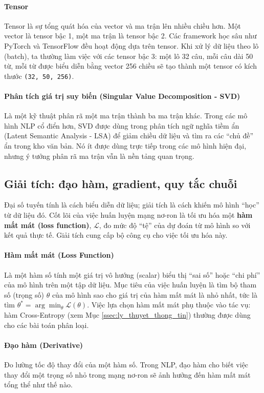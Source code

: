 \paragraph{Tensor}
Tensor là sự tổng quát hóa của vector và ma trận lên nhiều chiều hơn. Một vector là tensor bậc 1, một ma trận là tensor bậc 2. Các framework học sâu như PyTorch và TensorFlow đều hoạt động dựa trên tensor. Khi xử lý dữ liệu theo lô (batch), ta thường làm việc với các tensor bậc 3: một lô 32 câu, mỗi câu dài 50 từ, mỗi từ được biểu diễn bằng vector 256 chiều sẽ tạo thành một tensor có kích thước \texttt{(32, 50, 256)}.

\paragraph{Phân tích giá trị suy biến (Singular Value Decomposition - SVD)}
Là một kỹ thuật phân rã một ma trận thành ba ma trận khác. Trong các mô hình NLP cổ điển hơn, SVD được dùng trong phân tích ngữ nghĩa tiềm ẩn (Latent Semantic Analysis - LSA) để giảm chiều dữ liệu và tìm ra các “chủ đề” ẩn trong kho văn bản. Nó ít được dùng trực tiếp trong các mô hình hiện đại, nhưng ý tưởng phân rã ma trận vẫn là nền tảng quan trọng.

\subsection{Giải tích: đạo hàm, gradient, quy tắc chuỗi}
\label{ssec:giai_tich}
Đại số tuyến tính là cách biểu diễn dữ liệu; giải tích là cách khiến mô hình “học” từ dữ liệu đó. Cốt lõi của việc huấn luyện mạng nơ-ron là tối ưu hóa một \textbf{hàm mất mát (loss function)}, $\mathcal{L}$, đo mức độ “tệ” của dự đoán từ mô hình so với kết quả thực tế. Giải tích cung cấp bộ công cụ cho việc tối ưu hóa này.

\paragraph{Hàm mất mát (Loss Function)}
Là một hàm số tính một giá trị vô hướng (scalar) biểu thị “sai số” hoặc “chi phí” của mô hình trên một tập dữ liệu. Mục tiêu của việc huấn luyện là tìm bộ tham số (trọng số) $\theta$ của mô hình sao cho giá trị của hàm mất mát là nhỏ nhất, tức là tìm $\theta^* = \arg\min_{\theta} \mathcal{L}(\theta)$. Việc lựa chọn hàm mất mát phụ thuộc vào tác vụ: hàm Cross-Entropy (xem Mục \ref{ssec:ly_thuyet_thong_tin}) thường được dùng cho các bài toán phân loại.

\paragraph{Đạo hàm (Derivative)}
Đo lường tốc độ thay đổi của một hàm số. Trong NLP, đạo hàm cho biết việc thay đổi một trọng số nhỏ trong mạng nơ-ron sẽ ảnh hưởng đến hàm mất mát tổng thể như thế nào.

